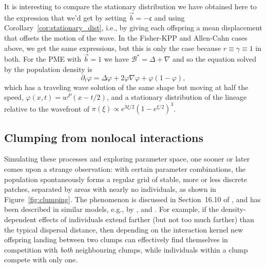 \documentclass[EJP]{ejpecp} %
\newcommand{\grad}{\nabla}
\newcommand{\DG}{\mathcal{B}}  %
\newcommand{\meanq}{\vec b}    %
\newcommand{\wavespeed}{\mathfrak{c}}    %
\newcommand{\Lgen}{\mathcal{L}}    %
\newcommand{\comment}[1]{{\color{blue} \it #1}}
\newcommand{\citet}[1]{\cite{#1}}
\begin{document}
It is interesting to compare the stationary distribution we have obtained here
to the expression that we'd get by setting $\meanq = -\wavespeed$
and using Corollary~\ref{cor:stationary_dist},
i.e., by giving each offspring a mean displacement that offsets the motion of the wave.
In the Fisher-KPP and Allen-Cahn cases above, we get the same expressions,
but this is only the case because $r\equiv\gamma\equiv1$ in both.
For the PME with $\meanq = 1$ we have $\DG^* = \Delta + \grad$ 
and so the equation solved by the population density is
$$
    \partial_t \varphi = \Delta \varphi + 2 \varphi \grad \varphi + \varphi (1 - \varphi) ,
$$
which has a traveling wave solution of the same shape but moving at half the speed,
$\varphi(x,t) = w^{P}(x-t/2)$,
and a stationary distribution of the lineage relative to the wavefront of
$\pi(\xi) \propto e^{3\xi/2} (1 - e^{\xi/2})^3$.



\subsection{Clumping from nonlocal interactions}

Simulating these processes and exploring parameter space,
one sooner or later comes upon a strange observation:
with certain parameter combinations, the population spontaneously forms a regular grid
of stable, more or less discrete patches, separated by areas with nearly no individuals,
as shown in Figure~\ref{fig:clumping}.
The phenomenon is discussed in Section~16.10 of \citet{haller2022evolutionary},
and has been described in similar models, e.g.,
by \citet{britton1990spatial,sasaki1997clumped,hernandezgarcia2004clustering,young2001reproductive}, and \citet{berestycki2009nonlocal}.
For example, if the density-dependent effects of individuals extend farther (but not too much farther)
than the typical dispersal distance,
then depending on the interaction kernel
new offspring landing between two clumps
can effectively find themselves in competition with 
\emph{both} neighbouring clumps,
while individuals within a clump compete with only one.
\end{document}
